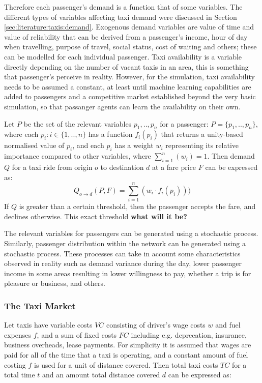 Therefore each passenger's demand is a function that of some variables. The
different types of variables affecting taxi demand were discussed in Section
\ref{sec:literature:taxis:demand}. Exogenous demand variables are value of time
and value of reliability that can be derived from a passenger's income, hour of
day when travelling, purpose of travel, social status, cost of waiting and
others; these can be modelled for each individual passenger. Taxi availability
is a variable directly depending on the number of vacant taxis in an area, this
is something that passenger's perceive in reality. However, for the simulation,
taxi availability needs to be assumed a constant, at least until machine
learning capabilities are added to passengers and a competitive market
established beyond the very basic simulation, so that passanger agents can
learn the availability on their own.

Let \(P\) be the set of the relevant variables \(p_1,..,p_n\) for
a  passenger: \(P = \{p_1,..,p_n\}\), \newline
where each \(p_i : i \in \{1, .., n\}\) has a function \(f_i (p_i) \) that
returns a unity-based  normalised value of \(p_i\), \newline 
and each \(p_i\) has a weight \(w_i\) representing its relative importance  
compared to other variables, where \(\sum_{i=1}^n (w_i) = 1 \). \newline 
Then demand \(Q\) for a taxi ride from origin \(o\) to destination \(d\) at a  
fare price \(F\) can be expressed as: 
\[ Q _{o \rightarrow d} (P,F) = \sum_{i=1}^{n} (w_i \cdot f_i (p_i) )) \]
If \(Q\) is greater than a certain threshold, then the passenger accepts the 
fare, and declines otherwise. This exact threshold \textbf{what will it be?}

The relevant variables for passengers can be generated using a stochastic
process. Similarly, passenger distribution within the network can be generated
using a stochastic process. These processes can take in account some
characteristics observed in reality such as demand variance during the day,
lower passenger income in some areas resulting in lower willingness to pay,
whether a trip is for pleasure or business, and others.


\subsubsection{The Taxi Market}
\label{sec:design:taxi}

Let taxis have variable costs \(VC\) consisting of driver's wage costs \(w\)
and fuel expenses \(f\), and a sum of fixed costs \(FC\) including e.g.
deprecation, insurance, business overheads, lease payments. For simplicity it
is assumed that wages are paid for all of the time that a taxi is operating,
and a constant amount of fuel costing \(f\) is used for a unit of distance
covered. Then total taxi costs \(TC\) for a total time \(t\) and an amount
total distance covered \(d\) can be expressed as:

